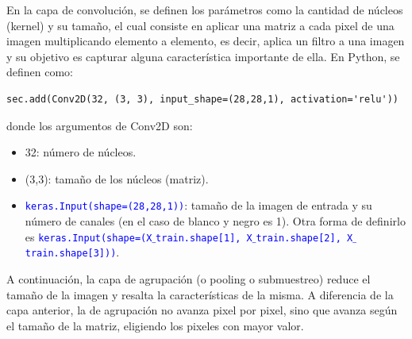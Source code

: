 \documentclass[a4paper, 12pt]{book}
\begin{document}
En la capa de convolución, se definen los parámetros como la cantidad de núcleos (kernel) y su tamaño, el cual consiste en aplicar una matriz a cada pixel de una imagen multiplicando elemento a elemento, es decir, aplica un filtro a una imagen y su objetivo es capturar alguna característica importante de ella.
En Python, se definen como:
\begin{verbatim}
sec.add(Conv2D(32, (3, 3), input_shape=(28,28,1), activation='relu'))
\end{verbatim}
donde los argumentos de Conv2D son:
\begin{itemize}
	\item 32: número de núcleos.
	\item (3,3): tamaño de los núcleos (matriz).
	\item \texttt{\textcolor{blue}{keras.Input(shape=(28,28,1))}}: tamaño de la imagen de entrada y su número de canales (en el caso de blanco y negro es 1). Otra forma de definirlo es \texttt{\textcolor{blue}{keras.Input(shape=(X$\_$train.shape[1], X$\_$train.shape[2], X$\_$train.shape[3]))}}.
\end{itemize}
A continuación, la capa de agrupación (o pooling o submuestreo) reduce el tamaño de la imagen y resalta la características de la misma. A diferencia de la capa anterior, la de agrupación no avanza pixel por pixel, sino que avanza según el tamaño de la matriz, eligiendo los pixeles con mayor valor.
\end{document}
